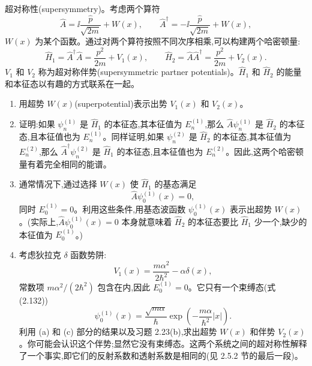 \begin{question}
超对称性(supersymmetry)。考虑两个算符
\[
\hat A=\ii\frac{\hat p}{\sqrt{2m}}+W(x),
\qquad
\hat A^\dagger=-\ii\frac{\hat p}{\sqrt{2m}}+W(x),\tag{3.116}
\]
$W(x)$ 为某个函数。通过对两个算符按照不同次序相乘,可以构建两个哈密顿量:
\[
\hat H_1=\hat A^\dagger\hat A=\frac{p^2}{2m}+V_1(x),
\qquad
\hat H_2=\hat A\hat A^\dagger=\frac{p^2}{2m}+V_2(x).\tag{3.117}
\]
$V_1$ 和 $V_2$ 称为超对称伴势(supersymmetric partner potentials)。$\hat H_1$ 和 $\hat H_2$ 的能量和本征态以有趣的方式联系在一起。
\begin{enumerate}
\item 用超势 $W(x)$(superpotential)表示出势 $V_1(x)$ 和 $V_2(x)$。
\item 证明:如果 $\psi_n^{(1)}$ 是 $\hat H_1$ 的本征态,其本征值为 $E_n^{(1)}$,那么 $\hat A\psi_n^{(1)}$ 是 $\hat H_2$ 的本征态,且本征值也为 $E_n^{(1)}$。同样证明,如果 $\psi_n^{(2)}$ 是 $\hat H_2$ 的本征态,其本征值为 $E_n^{(2)}$,那么 $\hat A^\dagger\psi_n^{(2)}$ 是 $\hat H_1$ 的本征态,且本征值也为 $E_n^{(2)}$。因此,这两个哈密顿量有着完全相同的能谱。
\item 通常情况下,通过选择 $W(x)$ 使 $\hat H_1$ 的基态满足
\[
\hat A\psi_0^{(1)}(x)=0,\tag{3.118}
\]
同时 $E_0^{(1)}=0$。利用这些条件,用基态波函数 $\psi_0^{(1)}(x)$ 表示出超势 $W(x)$。(实际上,$\hat A\psi_0^{(1)}(x)=0$ 本身就意味着 $\hat H_2$ 的本征态要比 $\hat H_1$ 少一个,缺少的本征值为 $E_0^{(1)}$。)
\item 考虑狄拉克 $\delta$ 函数势阱:
\[
V_1(x)=\frac{m\alpha^2}{2\hbar^2}-\alpha\delta(x),\tag{3.119}
\]
常数项 $m\alpha^2/(2\hbar^2)$ 包含在内,因此 $E_0^{(1)}=0$。它只有一个束缚态(式 (2.132))
\[
\psi_0^{(1)}(x)=\frac{\sqrt{m\alpha}}{\hbar}\exp\left(-\frac{m\alpha}{\hbar^2}|x|\right).\tag{3.120}
\]
利用 (a) 和 (c) 部分的结果以及习题 2.23(b),求出超势 $W(x)$ 和伴势 $V_2(x)$。你可能会认识这个伴势;显然它没有束缚态。这两个系统之间的超对称性解释了一个事实,即它们的反射系数和透射系数是相同的(见 2.5.2 节的最后一段)。
\end{enumerate}

\par\smallskip
{}

\end{question}
